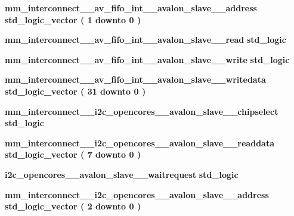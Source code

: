 \begin{DoxyCompactItemize}
{\bf mm\+\_\+interconnect\+\_\+\_\+av\+\_\+fifo\+\_\+int\+\_\+\_\+avalon\+\_\+slave\+\_\+\_\+address} {\bfseries \textcolor{comment}{std\+\_\+logic\+\_\+vector}\textcolor{vhdlchar}{ }\textcolor{vhdlchar}{(}\textcolor{vhdlchar}{ }\textcolor{vhdlchar}{ } \textcolor{vhdldigit}{1} \textcolor{vhdlchar}{ }\textcolor{keywordflow}{downto}\textcolor{vhdlchar}{ }\textcolor{vhdlchar}{ } \textcolor{vhdldigit}{0} \textcolor{vhdlchar}{ }\textcolor{vhdlchar}{)}\textcolor{vhdlchar}{ }} 
\item 
{\bf mm\+\_\+interconnect\+\_\+\_\+av\+\_\+fifo\+\_\+int\+\_\+\_\+avalon\+\_\+slave\+\_\+\_\+read} {\bfseries \textcolor{comment}{std\+\_\+logic}\textcolor{vhdlchar}{ }} 
\item 
{\bf mm\+\_\+interconnect\+\_\+\_\+av\+\_\+fifo\+\_\+int\+\_\+\_\+avalon\+\_\+slave\+\_\+\_\+write} {\bfseries \textcolor{comment}{std\+\_\+logic}\textcolor{vhdlchar}{ }} 
\item 
{\bf mm\+\_\+interconnect\+\_\+\_\+av\+\_\+fifo\+\_\+int\+\_\+\_\+avalon\+\_\+slave\+\_\+\_\+writedata} {\bfseries \textcolor{comment}{std\+\_\+logic\+\_\+vector}\textcolor{vhdlchar}{ }\textcolor{vhdlchar}{(}\textcolor{vhdlchar}{ }\textcolor{vhdlchar}{ } \textcolor{vhdldigit}{31} \textcolor{vhdlchar}{ }\textcolor{keywordflow}{downto}\textcolor{vhdlchar}{ }\textcolor{vhdlchar}{ } \textcolor{vhdldigit}{0} \textcolor{vhdlchar}{ }\textcolor{vhdlchar}{)}\textcolor{vhdlchar}{ }} 
\item 
{\bf mm\+\_\+interconnect\+\_\+\_\+i2c\+\_\+opencores\+\_\+\_\+avalon\+\_\+slave\+\_\+\_\+chipselect} {\bfseries \textcolor{comment}{std\+\_\+logic}\textcolor{vhdlchar}{ }} 
\item 
{\bf mm\+\_\+interconnect\+\_\+\_\+i2c\+\_\+opencores\+\_\+\_\+avalon\+\_\+slave\+\_\+\_\+readdata} {\bfseries \textcolor{comment}{std\+\_\+logic\+\_\+vector}\textcolor{vhdlchar}{ }\textcolor{vhdlchar}{(}\textcolor{vhdlchar}{ }\textcolor{vhdlchar}{ } \textcolor{vhdldigit}{7} \textcolor{vhdlchar}{ }\textcolor{keywordflow}{downto}\textcolor{vhdlchar}{ }\textcolor{vhdlchar}{ } \textcolor{vhdldigit}{0} \textcolor{vhdlchar}{ }\textcolor{vhdlchar}{)}\textcolor{vhdlchar}{ }} 
\item 
{\bf i2c\+\_\+opencores\+\_\+\_\+avalon\+\_\+slave\+\_\+\_\+waitrequest} {\bfseries \textcolor{comment}{std\+\_\+logic}\textcolor{vhdlchar}{ }} 
\item 
{\bf mm\+\_\+interconnect\+\_\+\_\+i2c\+\_\+opencores\+\_\+\_\+avalon\+\_\+slave\+\_\+\_\+address} {\bfseries \textcolor{comment}{std\+\_\+logic\+\_\+vector}\textcolor{vhdlchar}{ }\textcolor{vhdlchar}{(}\textcolor{vhdlchar}{ }\textcolor{vhdlchar}{ } \textcolor{vhdldigit}{2} \textcolor{vhdlchar}{ }\textcolor{keywordflow}{downto}\textcolor{vhdlchar}{ }\textcolor{vhdlchar}{ } \textcolor{vhdldigit}{0} \textcolor{vhdlchar}{ }\textcolor{vhdlchar}{)}\textcolor{vhdlchar}{ }} 

\end{DoxyCompactItemize}
